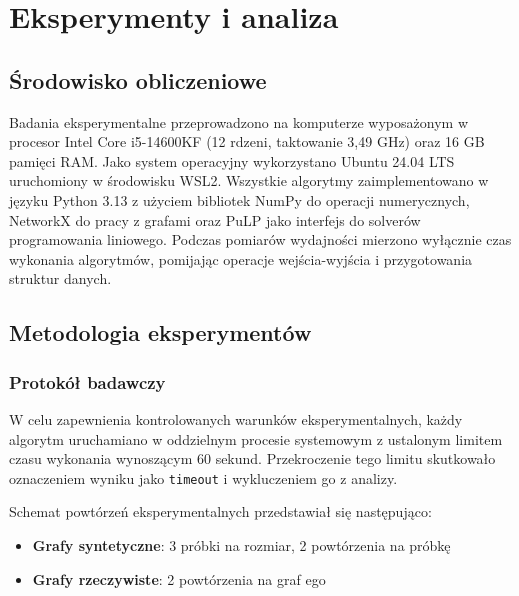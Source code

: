 \chapter{Eksperymenty i analiza}\label{chap:experiments}

\section{Środowisko obliczeniowe}

Badania eksperymentalne przeprowadzono na komputerze wyposażonym w procesor Intel Core i5-14600KF (12 rdzeni, taktowanie 3,49 GHz) oraz 16 GB pamięci RAM. Jako system operacyjny wykorzystano Ubuntu 24.04 LTS uruchomiony w środowisku WSL2. Wszystkie algorytmy zaimplementowano w języku Python 3.13 z użyciem bibliotek NumPy do operacji numerycznych, NetworkX do pracy z grafami oraz PuLP jako interfejs do solverów programowania liniowego. Podczas pomiarów wydajności mierzono wyłącznie czas wykonania algorytmów, pomijając operacje wejścia-wyjścia i przygotowania struktur danych.

\section{Metodologia eksperymentów}

\subsection{Protokół badawczy}

W celu zapewnienia kontrolowanych warunków eksperymentalnych, każdy algorytm uruchamiano w oddzielnym procesie systemowym z ustalonym limitem czasu wykonania wynoszącym 60 sekund. Przekroczenie tego limitu skutkowało oznaczeniem wyniku jako \texttt{timeout} i wykluczeniem go z analizy.

Schemat powtórzeń eksperymentalnych przedstawiał się następująco:

\begin{itemize}
  \item \textbf{Grafy syntetyczne}: 3 próbki na rozmiar, 2 powtórzenia na próbkę
  \item \textbf{Grafy rzeczywiste}: 2 powtórzenia na graf ego
\end{itemize}

